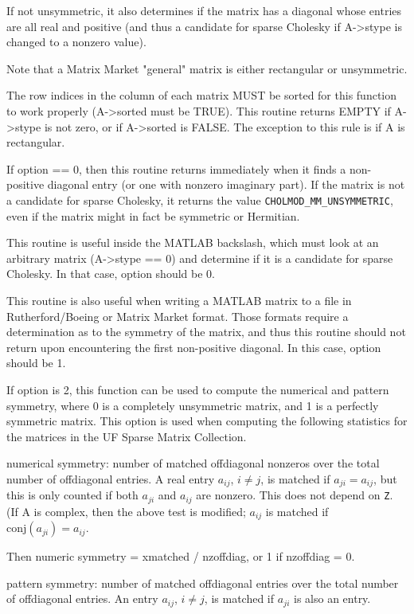 \documentclass[11pt]{article}
\begin{document}
If not unsymmetric, it also determines if the matrix has a diagonal whose
entries are all real and positive (and thus a candidate for sparse Cholesky
if A->stype is changed to a nonzero value).

Note that a Matrix Market "general" matrix is either rectangular or
unsymmetric.

The row indices in the column of each matrix MUST be sorted for this function
to work properly (A->sorted must be TRUE).  This routine returns EMPTY if
A->stype is not zero, or if A->sorted is FALSE.  The exception to this rule
is if A is rectangular.

If option == 0, then this routine returns immediately when it finds a
non-positive diagonal entry (or one with nonzero imaginary part).   If the
matrix is not a candidate for sparse Cholesky, it returns the value
{\tt CHOLMOD\_MM\_UNSYMMETRIC}, even if the matrix might in fact be symmetric or
Hermitian.

This routine is useful inside the MATLAB backslash, which must look at an
arbitrary matrix (A->stype == 0) and determine if it is a candidate for
sparse Cholesky.  In that case, option should be 0.

This routine is also useful when writing a MATLAB matrix to a file in
Rutherford/Boeing or Matrix Market format.  Those formats require a
determination as to the symmetry of the matrix, and thus this routine should
not return upon encountering the first non-positive diagonal.  In this case,
option should be 1.

If option is 2, this function can be used to compute the numerical and
pattern symmetry, where 0 is a completely unsymmetric matrix, and 1 is a
perfectly symmetric matrix.  This option is used when computing the following
statistics for the matrices in the UF Sparse Matrix Collection.

	numerical symmetry: number of matched offdiagonal nonzeros over
	the total number of offdiagonal entries.  A real entry $a_{ij}$,  $i \ne j$,
	is matched if $a_{ji} = a_{ij}$, but this is only counted if both
	$a_{ji}$ and $a_{ij}$ are nonzero.  This does not depend on {\tt Z}.
	(If A is complex, then the above test is modified; $a_{ij}$ is matched
	if $\mbox{conj}(a_{ji}) = a_{ij}$.

	Then numeric symmetry = xmatched / nzoffdiag, or 1 if nzoffdiag = 0.
 
	pattern symmetry: number of matched offdiagonal entries over the
	total number of offdiagonal entries.  An entry $a_{ij}$, $i \ne j$, is
	matched if $a_{ji}$ is also an entry.
\end{document}
